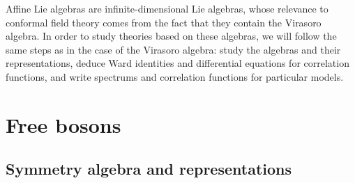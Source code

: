\documentclass[12pt,a4paper,notitlepage]{report}
\numberwithin{equation}{section}
\theoremstyle{break}
\begin{document}
Affine Lie algebras are infinite-dimensional Lie algebras, whose relevance to conformal field theory comes from the fact that they contain the Virasoro algebra. In order to study theories based on these algebras, we will follow the same steps as in the case of the Virasoro algebra: study the algebras and their representations, deduce Ward identities and differential equations for correlation functions, and write spectrums and correlation functions for particular models. 

\section{Free bosons}

\subsection{Symmetry algebra and representations \label{secaua}}
\end{document}
